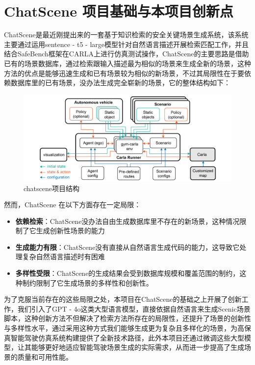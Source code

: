 \section{ChatScene 项目基础与本项目创新点}
ChatScene是最近刚提出来的一套基于知识检索的安全关键场景生成系统，该系统主要通过运用sentence - t5 - large模型针对自然语言描述开展检索匹配工作，并且结合SafeBench框架在CARLA上进行仿真测试操作，ChatScene的主要思路是借助已有的场景数据库，通过检索跟输入描述最为相似的场景来生成全新的场景，这种方法的优点是能够迅速生成和已有场景较为相似的新场景，不过其局限性在于要依赖数据库里的已有场景，没办法生成完全崭新的场景，它的整体结构如下：
\begin{figure}[H]
	\centering
	\includegraphics[width=1.0\textwidth]{"images/chatscene项目结构.pdf"}
	\caption{chatscene项目结构}
	\label{fig:chatscene_framework}
\end{figure}
然而，ChatScene 在以下方面存在一定局限：
\begin{itemize}
	\item \textbf{依赖检索}：ChatScene没办法自由生成数据库里不存在的新场景，这种情况限制了它生成创新性场景的能力
	\item \textbf{生成能力有限}：ChatScene没有直接从自然语言生成代码的能力，这导致它处理复杂自然语言描述时有困难
	\item \textbf{多样性受限}：ChatScene的生成结果会受到数据库规模和覆盖范围的制约，这种制约限制了它生成场景的多样性和创新性。
\end{itemize}

为了克服当前存在的这些局限之处，本项目在ChatScene的基础之上开展了创新工作，我们引入了GPT - 4o这类大型语言模型，直接依据自然语言来生成Scenic场景脚本，这种创新方法不但解决了检索方法所存在的局限性，还提升了场景的创新性与多样性水平，通过采用这种方式我们能够生成更为复杂且多样化的场景，为高保真智能驾驶仿真系统构建提供了全新技术路径，此外本项目还通过微调这些大型模型，让其能够更好地适应智能驾驶场景生成的实际需求，从而进一步提高了生成场景的质量和可用性能。